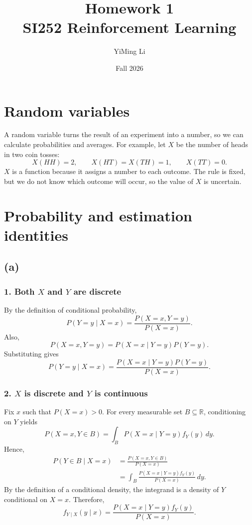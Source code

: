 \documentclass[11pt,a4paper]{article}
\title{Homework 1\\[4pt]\large SI252 Reinforcement Learning}
\author{YiMing Li}
\date{Fall 2026}
\begin{document}
\maketitle

\section{Random variables}
A random variable turns the result of an experiment into a number, so we can
calculate probabilities and averages. For example, let $X$ be the number of
heads in two coin tosses:
\[
X(HH)=2,\qquad X(HT)=X(TH)=1,\qquad X(TT)=0.
\]
$X$ is a function because it assigns a number to each outcome. The rule is
fixed, but we do not know which outcome will occur, so the value of $X$ is
uncertain.

\section{Probability and estimation identities}
\subsection*{(a)}
\subsubsection*{1. Both \(X\) and \(Y\) are discrete}

By the definition of conditional probability,
\[
P(Y=y\mid X=x)
=
\frac{P(X=x,Y=y)}{P(X=x)}.
\]
Also,
\[
P(X=x,Y=y)
=
P(X=x\mid Y=y)P(Y=y).
\]
Substituting gives
\[
P(Y=y\mid X=x)
=
\frac{P(X=x\mid Y=y)P(Y=y)}{P(X=x)}.
\]

\subsubsection*{2. \(X\) is discrete and \(Y\) is continuous}

Fix \(x\) such that \(P(X=x)>0\). For every measurable set
\(B\subseteq\mathbb{R}\), conditioning on \(Y\) yields
\[
P(X=x,Y\in B)
=
\int_B P(X=x\mid Y=y)f_Y(y)\,dy.
\]
Hence,
\[
\begin{aligned}
P(Y\in B\mid X=x)
&=
\frac{P(X=x,Y\in B)}{P(X=x)}\\
&=
\int_B
\frac{P(X=x\mid Y=y)f_Y(y)}{P(X=x)}
\,dy.
\end{aligned}
\]
By the definition of a conditional density, the integrand is a density
of \(Y\) conditional on \(X=x\). Therefore,
\[
f_{Y\mid X}(y\mid x)
=
\frac{P(X=x\mid Y=y)f_Y(y)}{P(X=x)}.
\]
\end{document}
